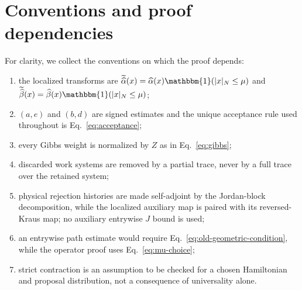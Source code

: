 \documentclass[aps,floatfix,10pt,amssymb,amsmath,superscriptaddress,nofootinbib,longbibliography,nobalancelastpage,twocolumn]{revtex4-2}
\newcommand{\id}{\mathbbm{1}}
\begin{document}
\section{Conventions and proof dependencies}

For clarity, we collect the conventions on which the proof depends:
\begin{enumerate}
 \item the localized transforms are $\widetilde{\widehat\alpha}(x)=\widehat\alpha(x)\id(|x|_N\leq\mu)$ and $\widetilde{\widehat\beta}(x)=\widehat\beta(x)\id(|x|_N\leq\mu)$;
 \item $(a,e)$ and $(b,d)$ are signed estimates and the unique acceptance rule used throughout is Eq.~\eqref{eq:acceptance};
 \item every Gibbs weight is normalized by $Z$ as in Eq.~\eqref{eq:gibbs};
 \item discarded work systems are removed by a partial trace, never by a full trace over the retained system;
 \item physical rejection histories are made self-adjoint by the
 Jordan-block decomposition, while the localized auxiliary map is paired
 with its reversed-Kraus map; no auxiliary entrywise $J$ bound is used;
 \item an entrywise path estimate would require Eq.~\eqref{eq:old-geometric-condition}, while the operator proof uses Eq.~\eqref{eq:mu-choice};
 \item strict contraction is an assumption to be checked for a chosen Hamiltonian and proposal distribution, not a consequence of universality alone.
\end{enumerate}


\end{document}
